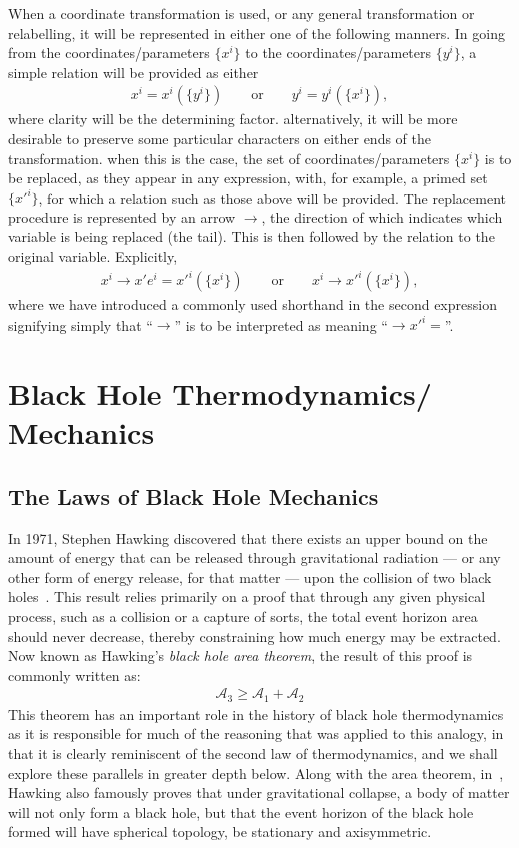 \documentclass[
twoside,
openright,
frontopenright,
]{dmathesis}
\begin{document}
When a coordinate transformation is used, or any general transformation or
relabelling, it will be represented in either one of the following manners. In
going from the coordinates/parameters $\{x^i\}$ to the coordinates/parameters
$\{y^i\}$, a simple relation will be provided as either
\begin{align*}
  x^i = x^i(\{y^i\})\qquad \mbox{or} \qquad y^i = y^i(\{x^i\}),
\end{align*}
where clarity will be the determining factor. alternatively, it will be more
desirable to preserve some particular characters on either ends of the
transformation. when this is the case, the set of coordinates/parameters
$\{x^i\}$ is to be replaced, as they appear in any expression, with, for
example, a primed set $\{x'^i\}$, for which a relation such as those above
will be provided. The replacement procedure is represented by an arrow $\to$,
the direction of which indicates which variable is being replaced (the
tail). This is then followed by the relation to the original
variable. Explicitly,
\begin{align*}
  x^i \to x'e^i=x'^i(\{x^i\}) \qquad \mbox{or} \qquad x^i \to x'^i(\{x^i\}),
\end{align*}
where we have introduced a commonly used shorthand in the second expression
signifying simply that ``$\to$'' is to be interpreted as meaning
``$\to x'^i =$''.

\chapter{Black Hole Thermodynamics/ Mechanics}
\label{chap:BHTD}

\section{The Laws of Black Hole Mechanics}
\label{sec:fourlaws}

In 1971, Stephen Hawking discovered that there exists an upper bound on the
amount of energy that can be released through gravitational radiation --- or any
other form of energy release, for that matter --- upon the collision of two
black holes~\cite{Hawking:1971tu,Hawking:1971vc}. This result relies primarily
on a proof that through any given physical process, such as a collision or a
capture of sorts, the total event horizon area should never decrease, thereby
constraining how much energy may be extracted. Now known as Hawking's
\emph{black hole area theorem}, the result of this proof is commonly written as:
\begin{align}
  \label{eq:areatheorem}
  \mathcal{A}_3 \geqslant \mathcal{A}_1+\mathcal{A}_2
\end{align}
This theorem has an important role in the history of black hole thermodynamics
as it is responsible for much of the reasoning that was applied to this analogy,
in that it is clearly reminiscent of the second law of thermodynamics, and we
shall explore these parallels in greater depth below. Along with the area
theorem, in~\cite{Hawking:1971vc}, Hawking also famously proves that under
gravitational collapse, a body of matter will not only form a black hole, but
that the event horizon of the black hole formed will have spherical topology, be
stationary and axisymmetric.
\end{document}
